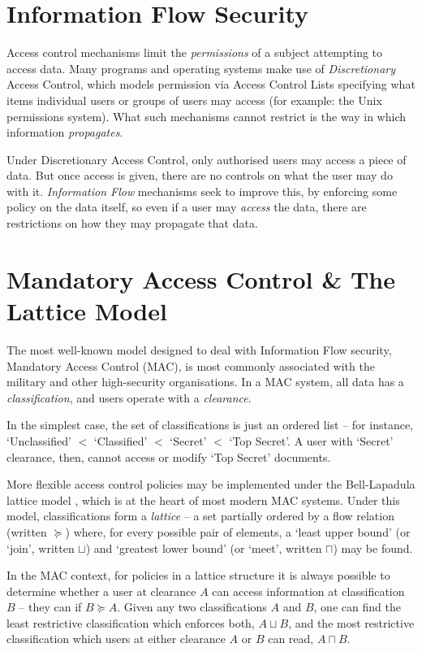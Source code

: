 \section{Information Flow Security}

Access control mechanisms limit the \textit{permissions} of a subject attempting to access data. Many programs and operating systems make use of \textit{Discretionary} Access Control, which models permission via Access Control Lists specifying what items individual users or groups of users may access (for example: the Unix permissions system). What such mechanisms cannot restrict is the way in which information \textit{propagates}.

Under Discretionary Access Control, only authorised users may access a piece of data. But once access is given, there are no controls on what the user may do with it. \textit{Information Flow} mechanisms seek to improve this, by enforcing some policy on the data itself, so even if a user may \textit{access} the data, there are restrictions on how they may propagate that data.

\section{Mandatory Access Control \& The Lattice Model}

The most well-known model designed to deal with Information Flow security, Mandatory Access Control (MAC), is most commonly associated with the military and other high-security organisations. In a MAC system, all data has a \textit{classification}, and users operate with a \textit{clearance}. 

In the simplest case, the set of classifications is just an ordered list -- for instance, `Unclassified' $ < $ `Classified' $ < $ `Secret' $ < $ `Top Secret'. A user with `Secret' clearance, then, cannot access or modify `Top Secret' documents.

More flexible access control policies may be implemented under the Bell-Lapadula lattice model \cite{bell1973lattice}, which is at the heart of most modern MAC systems. Under this model, classifications form a \textit{lattice} -- a set partially ordered by a flow relation (written $ \succeq $) where, for every possible pair of elements, a `least upper bound' (or `join', written $ \sqcup $) and `greatest lower bound' (or `meet', written $ \sqcap $) may be found.

In the MAC context, for policies in a lattice structure it is always possible to determine whether a user at clearance $ A $ can access information at classification $ B $ -- they can if $ B \succeq A $. Given any two classifications $ A $ and $ B $, one can find the least restrictive classification which enforces both, $ A \sqcup B $, and the most restrictive classification which users at either clearance $ A $ or $ B $ can read, $ A \sqcap B $.

